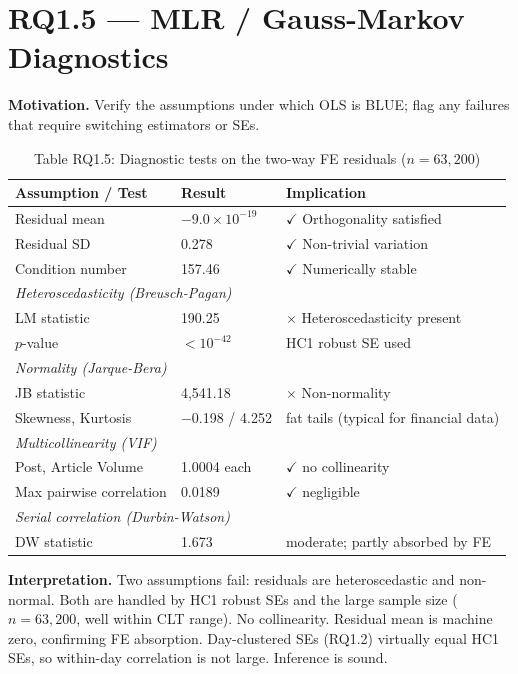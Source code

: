 \documentclass[11pt]{article}
\begin{document}
\section*{RQ1.5 --- MLR / Gauss-Markov Diagnostics}\label{sec:rq1.5}
\textbf{Motivation.} Verify the assumptions under which OLS is BLUE; flag any failures that require switching estimators or SEs.

\begin{table}[H]
\centering
\caption*{Table RQ1.5: Diagnostic tests on the two-way FE residuals ($n = 63{,}200$)}
\begin{tabular}{lll}
\toprule
Assumption / Test & Result & Implication \\
\midrule
Residual mean & $-9.0 \times 10^{-19}$ & $\checkmark$ Orthogonality satisfied \\
Residual SD & 0.278 & $\checkmark$ Non-trivial variation \\
Condition number & 157.46 & $\checkmark$ Numerically stable \\
\midrule
\multicolumn{3}{l}{\textit{Heteroscedasticity (Breusch-Pagan)}} \\
LM statistic & 190.25 & $\times$ Heteroscedasticity present \\
$p$-value & $< 10^{-42}$ & HC1 robust SE used \\
\midrule
\multicolumn{3}{l}{\textit{Normality (Jarque-Bera)}} \\
JB statistic & 4{,}541.18 & $\times$ Non-normality \\
Skewness, Kurtosis & $-$0.198 / 4.252 & fat tails (typical for financial data) \\
\midrule
\multicolumn{3}{l}{\textit{Multicollinearity (VIF)}} \\
Post, Article Volume & 1.0004 each & $\checkmark$ no collinearity \\
Max pairwise correlation & 0.0189 & $\checkmark$ negligible \\
\midrule
\multicolumn{3}{l}{\textit{Serial correlation (Durbin-Watson)}} \\
DW statistic & 1.673 & moderate; partly absorbed by FE \\
\bottomrule
\end{tabular}
\end{table}

\textbf{Interpretation.} Two assumptions fail: residuals are heteroscedastic and non-normal. Both are handled by HC1 robust SEs and the large sample size ($n = 63{,}200$, well within CLT range). No collinearity. Residual mean is machine zero, confirming FE absorption. Day-clustered SEs (RQ1.2) virtually equal HC1 SEs, so within-day correlation is not large. Inference is sound.
\end{document}
